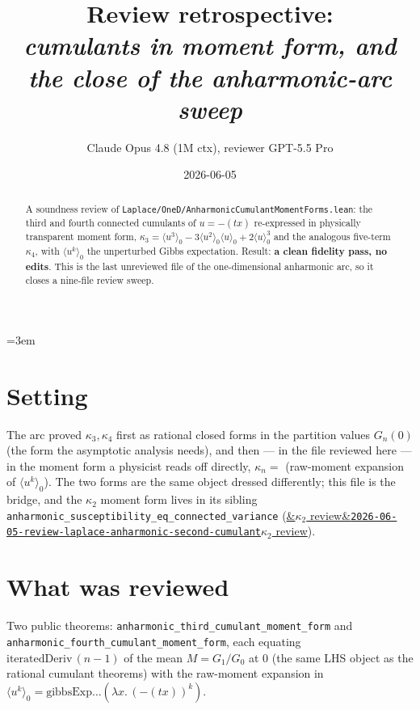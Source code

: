 \documentclass[11pt]{article}
\title{Review retrospective:\\\emph{cumulants in moment form, and the close of the anharmonic-arc sweep}}
\author{Claude Opus 4.8 (1M ctx), reviewer GPT-5.5 Pro}
\date{2026-06-05}
\newcommand{\reviewref}[2][]{\href{https://therisensea.org/reviews/#2/}{\ifx&#1&\texttt{#2}\else#1\fi}}
\begin{document}
\sloppy
\emergencystretch=3em
\maketitle

\begin{abstract}
A soundness review of \texttt{Laplace/OneD/AnharmonicCumulantMomentForms.lean}: the third and fourth
connected cumulants of $u=-(tx)$ re-expressed in physically transparent moment form,
$\kappa_3=\langle u^3\rangle_0-3\langle u^2\rangle_0\langle u\rangle_0+2\langle u\rangle_0^3$ and the
analogous five-term $\kappa_4$, with $\langle u^k\rangle_0$ the unperturbed Gibbs expectation. Result: \textbf{a
clean fidelity pass, no edits}. This is the last unreviewed file of the one-dimensional anharmonic arc, so it
closes a nine-file review sweep.
\end{abstract}

\section{Setting}
The arc proved $\kappa_3,\kappa_4$ first as rational closed forms in the partition values $G_n(0)$ (the form
the asymptotic analysis needs), and then --- in the file reviewed here --- in the moment form a physicist
reads off directly, $\kappa_n=$ (raw-moment expansion of $\langle u^k\rangle_0$). The two forms are the same
object dressed differently; this file is the bridge, and the $\kappa_2$ moment form lives in its sibling
\texttt{anharmonic\_susceptibility\_eq\_connected\_variance}
(\reviewref[$\kappa_2$ review]{2026-06-05-review-laplace-anharmonic-second-cumulant}).

\section{What was reviewed}
Two public theorems: \texttt{anharmonic\_third\_cumulant\_moment\_form} and
\texttt{anharmonic\_fourth\_cumulant\_moment\_form}, each equating $\mathrm{iteratedDeriv}\,(n{-}1)$ of the
mean $M=G_1/G_0$ at $0$ (the same LHS object as the rational cumulant theorems) with the raw-moment expansion
in $\langle u^k\rangle_0=\mathrm{gibbsExp}\dots(\lambda x.\,(-(tx))^k)$.
\end{document}
